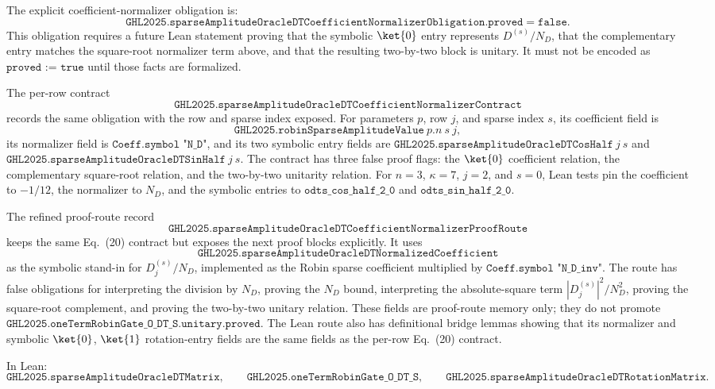 The explicit coefficient-normalizer obligation is:
\[
  \texttt{GHL2025.sparseAmplitudeOracleDTCoefficientNormalizerObligation.proved}
  =
  \texttt{false}.
\]
This obligation requires a future Lean statement proving that the symbolic
\(\ket{0}\) entry represents \(D^{(s)}/N_D\), that the complementary entry
matches the square-root normalizer term above, and that the resulting
two-by-two block is unitary.  It must not be encoded as
\(\texttt{proved := true}\) until those facts are formalized.

The per-row contract
\[
  \texttt{GHL2025.sparseAmplitudeOracleDTCoefficientNormalizerContract}
\]
records the same obligation with the row and sparse index exposed.  For
parameters \(p\), row \(j\), and sparse index \(s\), its coefficient field is
\[
  \texttt{GHL2025.robinSparseAmplitudeValue}\ p.n\ s\ j,
\]
its normalizer field is \(\texttt{Coeff.symbol "N\_D"}\), and its two symbolic
entry fields are
\(\texttt{GHL2025.sparseAmplitudeOracleDTCosHalf}\ j\ s\) and
\(\texttt{GHL2025.sparseAmplitudeOracleDTSinHalf}\ j\ s\).  The contract has
three false proof flags: the \(\ket{0}\) coefficient relation, the
complementary square-root relation, and the two-by-two unitarity relation.  For
\(n=3\), \(\kappa=7\), \(j=2\), and \(s=0\), Lean tests pin the coefficient to
\(-1/12\), the normalizer to \(N_D\), and the symbolic entries to
\(\texttt{odts\_cos\_half\_2\_0}\) and
\(\texttt{odts\_sin\_half\_2\_0}\).

The refined proof-route record
\[
  \texttt{GHL2025.sparseAmplitudeOracleDTCoefficientNormalizerProofRoute}
\]
keeps the same Eq.~(20) contract but exposes the next proof blocks explicitly.
It uses
\[
  \texttt{GHL2025.sparseAmplitudeOracleDTNormalizedCoefficient}
\]
as the symbolic stand-in for \(D_j^{(s)}/N_D\), implemented as the Robin sparse
coefficient multiplied by \(\texttt{Coeff.symbol "N\_D\_inv"}\).  The route
has false obligations for interpreting the division by \(N_D\), proving the
\(N_D\) bound, interpreting the absolute-square term
\(|D_j^{(s)}|^2/N_D^2\), proving the square-root complement, and proving the
two-by-two unitary relation.  These fields are proof-route memory only; they
do not promote \(\texttt{GHL2025.oneTermRobinGate\_O\_DT\_S.unitary.proved}\).
The Lean route also has definitional bridge lemmas showing that its normalizer
and symbolic \(\ket{0}\), \(\ket{1}\) rotation-entry fields are the same fields
as the per-row Eq.~(20) contract.

In Lean:
\[
  \texttt{GHL2025.sparseAmplitudeOracleDTMatrix},
  \qquad
  \texttt{GHL2025.oneTermRobinGate\_O\_DT\_S},
  \qquad
  \texttt{GHL2025.sparseAmplitudeOracleDTRotationMatrix}.
\]

